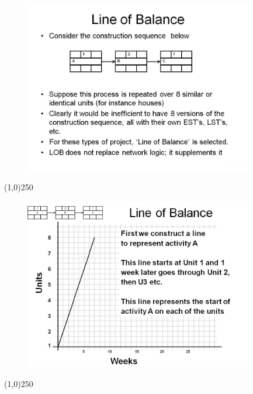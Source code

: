 




\begin{frame}
\begin{figure}
	\centering
		\includegraphics[width = 10.0cm]{oldnotes/Slide243.jpg}
\end{figure}
\end{frame}
\begin{center}\line(1,0){250}\end{center}






\begin{frame}
\begin{figure}
	\centering
		\includegraphics[width = 10.0cm]{oldnotes/Slide244.jpg}
\end{figure}
\end{frame}
\begin{center}\line(1,0){250}\end{center}






